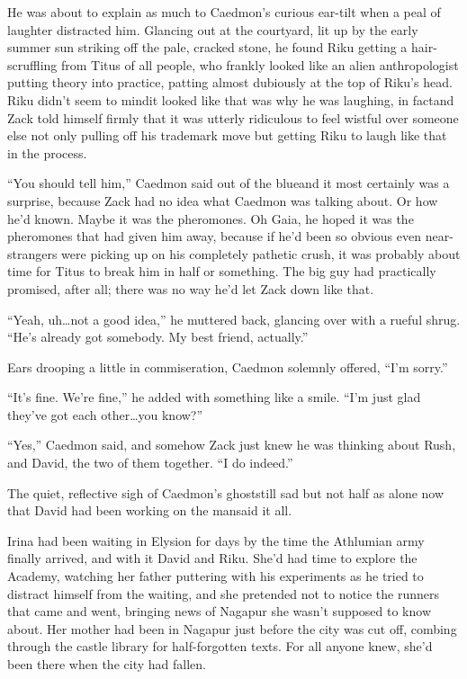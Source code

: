 He was about to explain as much to Caedmon's curious ear-tilt when a peal of laughter distracted him. Glancing out at the courtyard, lit up by the early summer sun striking off the pale, cracked stone, he found Riku getting a hair-scruffling from Titus of all people, who frankly looked like an alien anthropologist putting theory into practice, patting almost dubiously at the top of Riku's head. Riku didn't seem to mind\textemdash it looked like that was why he was laughing, in fact\textemdash and Zack told himself firmly that it was utterly ridiculous to feel wistful over someone else not only pulling off his trademark move but getting Riku to laugh like that in the process.

``You should tell him,'' Caedmon said out of the blue\textemdash and it most certainly was a surprise, because Zack had no idea what Caedmon was talking about. Or how he'd known. Maybe it was the pheromones. Oh Gaia, he hoped it was the pheromones that had given him away, because if he'd been so obvious even near-strangers were picking up on his completely pathetic crush, it was probably about time for Titus to break him in half or something. The big guy had practically promised, after all; there was no way he'd let Zack down like that.

``Yeah, uh\ldots not a good idea,'' he muttered back, glancing over with a rueful shrug. ``He's already got somebody. My best friend, actually.''

Ears drooping a little in commiseration, Caedmon solemnly offered, ``I'm sorry.''

``It's fine. We're fine,'' he added with something like a smile. ``I'm just glad they've got each other\ldots you know?''

``Yes,'' Caedmon said, and somehow Zack just knew he was thinking about Rush, and David, the two of them together. ``I do indeed.''

The quiet, reflective sigh of Caedmon's ghost\textemdash still sad but not half as alone now that David had been working on the man\textemdash said it all.


\scenechange


Irina had been waiting in Elysion for days by the time the Athlumian army finally arrived, and with it David and Riku. She'd had time to explore the Academy, watching her father puttering with his experiments as he tried to distract himself from the waiting, and she pretended not to notice the runners that came and went, bringing news of Nagapur she wasn't supposed to know about. Her mother had been in Nagapur just before the city was cut off, combing through the castle library for half-forgotten texts. For all anyone knew, she'd been there when the city had fallen.

